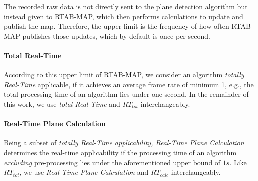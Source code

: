\documentclass[main.tex]{subfiles}
\begin{document}
The recorded raw data is not directly sent to the plane detection algorithm but instead given to RTAB-MAP, which then performs
calculations to update and publish the map.
Therefore, the upper limit is the frequency of how often RTAB-MAP publishes those updates, which by default is once per second.

\paragraph{Total Real-Time}
According to this upper limit of RTAB-MAP, we consider an algorithm \textit{totally Real-Time} applicable, if it achieves an average frame
rate of minimum 1, e.g., the total processing time of an algorithm lies under one second. In the remainder of this work, we
use \textit{total Real-Time} and $RT_{tot}$ interchangeably. 

\paragraph{Real-Time Plane Calculation}
Being a subset of \textit{totally Real-Time applicability, Real-Time Plane Calculation} determines the real-time applicability if the processing time of an algorithm
\textit{excluding} pre-processing lies under the aforementioned upper bound of $1s$. Like $RT_{tot}$, we use 
\textit{Real-Time Plane Calculation} and $RT_{calc}$ interchangeably.

\end{document}
